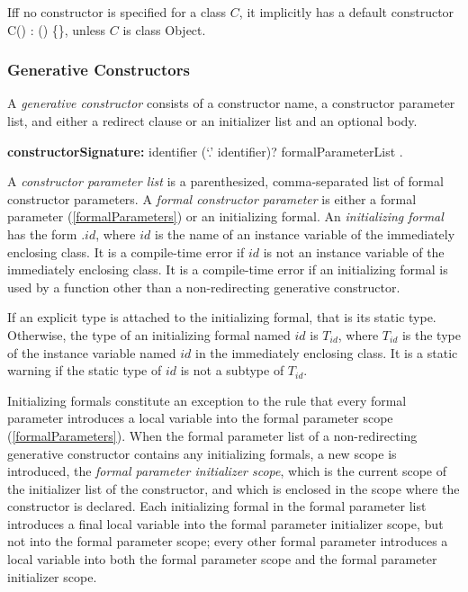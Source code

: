 \documentclass{article}
\newcommand{\code}[1]{{\sf #1}}
\begin{document}
\LMHash{}
Iff no constructor is specified for a class $C$, it implicitly has a default constructor \code{C() : \SUPER{}() \{\}}, unless $C$ is class \code{Object}.

\subsubsection{Generative Constructors}

\LMHash{}
A {\em generative constructor} consists of a constructor name, a constructor parameter list, and either a redirect clause or an initializer list and an optional body.

\begin{grammar}
{\bf constructorSignature:}
      identifier (`{\escapegrammar .}' identifier)? formalParameterList
    .
 \end{grammar}

\LMHash{}
A {\em constructor parameter list} is a parenthesized, comma-separated list of formal constructor parameters. A {\em formal constructor parameter} is either a formal parameter (\ref{formalParameters}) or an initializing formal. An {\em initializing formal} has the form \code{\THIS{}.$id$}, where $id$ is the name of an instance variable of the immediately enclosing class.  It is a compile-time error if $id$ is not an instance variable of the immediately enclosing class. It is a compile-time error if an initializing formal is used by a function other than a non-redirecting generative constructor.

\LMHash{}
If an explicit type is attached to the initializing formal, that is its static type.
Otherwise, the type of an initializing formal named $id$ is $T_{id}$, where $T_{id}$ is the type of the instance variable named $id$ in the immediately enclosing class.
It is a static warning if the static type of $id$ is not a subtype of $T_{id}$.

\LMHash{}
Initializing formals constitute an exception to the rule that every formal parameter introduces a local variable into the formal parameter scope (\ref{formalParameters}).
When the formal parameter list of a non-redirecting generative constructor contains any initializing formals, a new scope is introduced, the {\em formal parameter initializer scope}, which is the current scope of the initializer list of the constructor, and which is enclosed in the scope where the constructor is declared.
Each initializing formal in the formal parameter list introduces a final local variable into the formal parameter initializer scope, but not into the formal parameter scope; every other formal parameter introduces a local variable into both the formal parameter scope and the formal parameter initializer scope.
\end{document}
